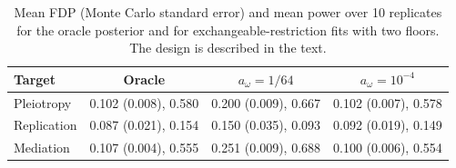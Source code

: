 \begin{table}[htbp]
\centering
\caption{Mean FDP (Monte Carlo standard error) and mean power over 10 replicates for the oracle posterior and for exchangeable-restriction fits with two floors. The design is described in the text.}\label{tab:floor-bias}
\begin{tabular}{@{}lccc@{}}
\toprule
Target & Oracle & $a_\omega=1/64$ & $a_\omega=10^{-4}$\\
\midrule
Pleiotropy & 0.102 (0.008), 0.580 & 0.200 (0.009), 0.667 & 0.102 (0.007), 0.578\\
Replication & 0.087 (0.021), 0.154 & 0.150 (0.035), 0.093 & 0.092 (0.019), 0.149\\
Mediation & 0.107 (0.004), 0.555 & 0.251 (0.009), 0.688 & 0.100 (0.006), 0.554\\
\bottomrule
\end{tabular}
\end{table}
